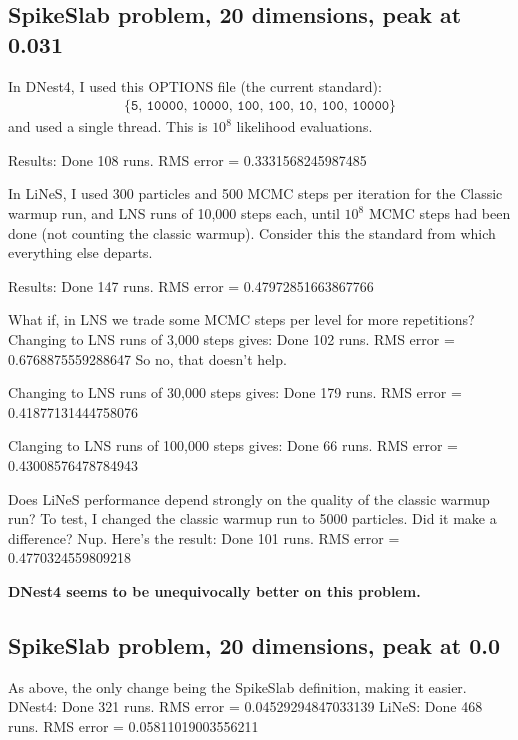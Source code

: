 \documentclass[a4paper, 12pt]{article}
\begin{document}
\subsection{SpikeSlab problem, 20 dimensions, peak at 0.031}
In DNest4, I used this OPTIONS file (the current standard):
\begin{align}
\{\texttt{5, 10000, 10000, 100, 100, 10, 100, 10000}\}
\end{align}
and used
a single thread. This is $10^8$ likelihood evaluations.

Results:
Done 108 runs. RMS error = 0.3331568245987485

In LiNeS, I used 300 particles and 500 MCMC steps per iteration
for the Classic warmup run, and
LNS runs of 10,000 steps each, until $10^8$ MCMC steps
had been done (not counting the classic warmup).
Consider this the standard from which everything else
departs.

Results:
Done 147 runs. RMS error = 0.47972851663867766

What if, in LNS we trade some MCMC steps per level
for more repetitions? Changing to LNS runs of
3,000 steps gives:
Done 102 runs. RMS error = 0.6768875559288647
So no, that doesn't help.

Changing to LNS runs of 30,000 steps gives:
Done 179 runs. RMS error = 0.41877131444758076

Clanging to LNS runs of 100,000 steps gives:
Done 66 runs. RMS error = 0.43008576478784943

Does LiNeS performance depend strongly on the quality of the
classic warmup run? To test, I changed the classic warmup run to 5000
particles. Did it make a difference? Nup. Here's the result:
Done 101 runs. RMS error = 0.4770324559809218

{\bf DNest4 seems to be unequivocally better on this problem.}

\subsection{SpikeSlab problem, 20 dimensions, peak at 0.0}
As above, the only change being the SpikeSlab definition, making it
easier.
DNest4: Done 321 runs. RMS error = 0.04529294847033139
LiNeS: Done 468 runs. RMS error = 0.05811019003556211



\begin{thebibliography}{999}
\end{thebibliography}
\end{document}
